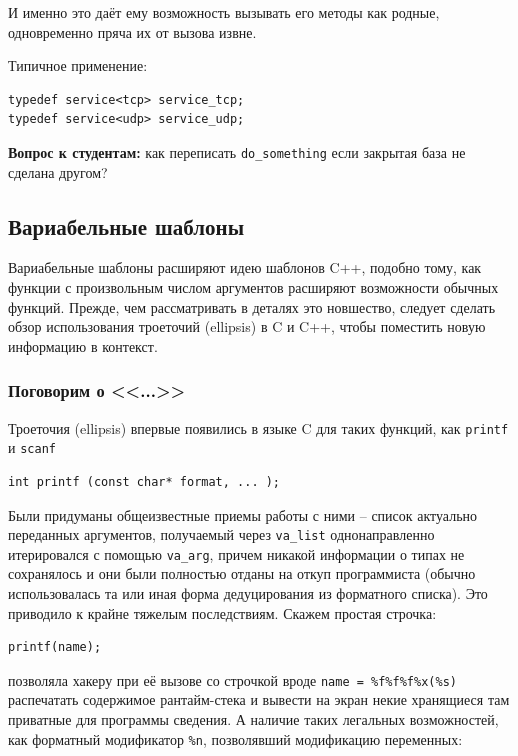 \documentclass[a4paper,12pt,oneside]{article}
\newif\ifanswers
\renewcommand{\texttt}[2][black]{\textcolor{#1}{\ttfamily #2}}
\begin{document}
И именно это даёт ему возможность вызывать его методы как родные, одновременно пряча их от вызова извне.

Типичное применение:

\begin{lstlisting}
typedef service<tcp> service_tcp;
typedef service<udp> service_udp;
\end{lstlisting}

\textbf{Вопрос к студентам:} как переписать \lstinline!do_something! если закрытая база не сделана другом?

\ifanswers
Как вариант: \lstinline!transport_type::send(....);!
\fi

\pagebreak
\subsection{Вариабельные шаблоны}\label{VariadicTemplates}

Вариабельные шаблоны расширяют идею шаблонов C++, подобно тому, как функции с произвольным числом аргументов расширяют возможности обычных функций. Прежде, чем рассматривать в деталях это новшество, следует сделать обзор использования троеточий (ellipsis) в C и C++, чтобы поместить новую информацию в контекст.

\subsubsection{Поговорим о <<\texttt{...}>>}

Троеточия (ellipsis) впервые появились в языке C для таких функций, как \lstinline!printf! и \lstinline!scanf! 

\begin{lstlisting}
int printf (const char* format, ... );
\end{lstlisting}

Были придуманы общеизвестные приемы работы с ними -- список актуально переданных аргументов, получаемый через \lstinline!va_list! однонаправленно итерировался с помощью \lstinline!va_arg!, причем никакой информации о типах не сохранялось и они были полностью отданы на откуп программиста (обычно использовалась та или иная форма дедуцирования из форматного списка). Это приводило к крайне тяжелым последствиям. Скажем простая строчка:

\begin{lstlisting}
printf(name);
\end{lstlisting}

позволяла хакеру при её вызове со строчкой вроде \lstinline!name = %f%f%f%x(%s)! распечатать содержимое рантайм-стека и вывести на экран некие хранящиеся там приватные для программы сведения. А наличие таких легальных возможностей, как форматный модификатор \lstinline!%n!, позволявший модификацию переменных:
\end{document}
